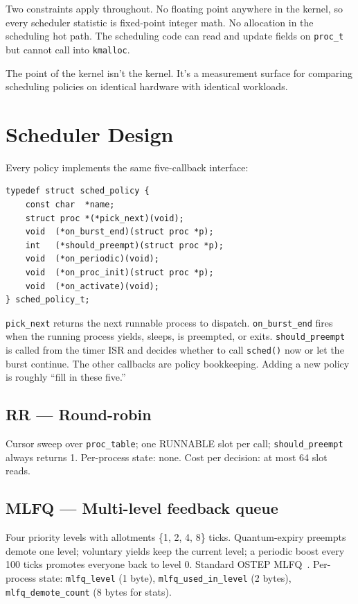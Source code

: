 \documentclass[11pt]{article}
\begin{document}
Two constraints apply throughout. No floating point anywhere in the kernel,
so every scheduler statistic is fixed-point integer math. No allocation in
the scheduling hot path. The scheduling code can read and update fields on
\texttt{proc\_t} but cannot call into \texttt{kmalloc}.

The point of the kernel isn't the kernel. It's a measurement surface for
comparing scheduling policies on identical hardware with identical
workloads.

\section{Scheduler Design}
\label{sec:design}

Every policy implements the same five-callback interface:

\begin{lstlisting}[style=cstyle]
typedef struct sched_policy {
    const char  *name;
    struct proc *(*pick_next)(void);
    void  (*on_burst_end)(struct proc *p);
    int   (*should_preempt)(struct proc *p);
    void  (*on_periodic)(void);
    void  (*on_proc_init)(struct proc *p);
    void  (*on_activate)(void);
} sched_policy_t;
\end{lstlisting}

\texttt{pick\_next} returns the next runnable process to dispatch.
\texttt{on\_burst\_end} fires when the running process yields, sleeps, is
preempted, or exits. \texttt{should\_preempt} is called from the timer ISR
and decides whether to call \texttt{sched()} now or let the burst continue.
The other callbacks are policy bookkeeping. Adding a new policy is roughly
``fill in these five.''

\subsection*{RR --- Round-robin}

Cursor sweep over \texttt{proc\_table}; one RUNNABLE slot per call;
\texttt{should\_preempt} always returns 1. Per-process state: none. Cost per
decision: at most 64 slot reads.

\subsection*{MLFQ --- Multi-level feedback queue}

Four priority levels with allotments \{1, 2, 4, 8\} ticks. Quantum-expiry
preempts demote one level; voluntary yields keep the current level; a
periodic boost every 100 ticks promotes everyone back to level 0. Standard
OSTEP MLFQ~\cite{ostep}. Per-process state: \texttt{mlfq\_level} (1 byte),
\texttt{mlfq\_used\_in\_level} (2 bytes), \texttt{mlfq\_demote\_count}
(8 bytes for stats).
\end{document}
